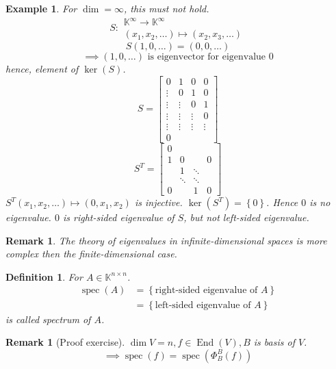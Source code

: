 \documentclass{article}
\newcounter{lecref}[section]
\numberwithin{lecref}{section}
\newtheorem{example}[lecref]{Example}
\newtheorem{definition}[lecref]{Definition}
\newtheorem{remark}[lecref]{Remark}
\newcommand{\set}[1]{\left\{#1\right\}}
\begin{document}
\begin{example} %
  For $\dim = \infty$, this must not hold.
  \[ S: \substack{\mathbb K^\infty \to \mathbb K^\infty \\ (x_1, x_2, \dots) \mapsto (x_2, x_3, \dots)} \]
  \[ S(1, 0, \dots) = (0, 0, \dots) \]
  \[ \implies (1, 0, \dots) \text{ is eigenvector for eigenvalue } 0 \]
  hence, element of $\ker(S)$.
  \[
    S = \begin{bmatrix}
      0 & 1 & 0 & 0 \\
      \vdots & 0 & 1 & 0 \\
      \vdots & \vdots & 0 & 1 \\
      \vdots & \vdots & \vdots & 0 \\
      \vdots & \vdots & \vdots & \vdots \\
      0 & & &
    \end{bmatrix}
  \] \[
    S^T = \begin{bmatrix}
      0 & & & \\
      1 & 0 &  & 0 \\
        & 1 & \ddots & \\
        & \ddots & \ddots & \\
      0 &  & 1 & 0
    \end{bmatrix}
  \]
  $S^T(x_1, x_2, \dots) \mapsto (0, x_1, x_2)$ is injective.
  $\ker(S^T) = \set{0}$. Hence $0$ is no eigenvalue.
  $0$ is right-sided eigenvalue of $S$, but not left-sided eigenvalue.
\end{example}

\begin{remark}
  The theory of eigenvalues in infinite-dimensional spaces is more complex then the finite-dimensional case.
\end{remark}

\begin{definition} %
  For $A \in \mathbb K^{n \times n}$.
  \begin{align*}
    \operatorname{spec}(A) &= \set{\text{right-sided eigenvalue of } A} \\
        &= \set{\text{left-sided eigenvalue of } A}
  \end{align*}
  is called \emph{spectrum of $A$}.
\end{definition}

\begin{remark}[Proof exercise]
  $\dim{V} = n, f \in \operatorname{End}(V), B$ is basis of $V$.
  \[ \implies \operatorname{spec}(f) = \operatorname{spec}(\Phi_B^B(f)) \]
\end{remark}
\end{document}
